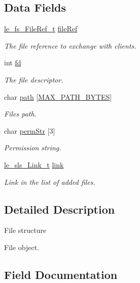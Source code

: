 \subsection*{Data Fields}
\begin{DoxyCompactItemize}
\item 
\hyperlink{le__fs_8h_a5d6a6ea918795062df6645f9ae8ebfe0}{le\+\_\+fs\+\_\+\+File\+Ref\+\_\+t} \hyperlink{struct_file__t_a0cdf3f9e3ed35e42fb588720abaff401}{file\+Ref}
\begin{DoxyCompactList}\small\item\em The file reference to exchange with clients. \end{DoxyCompactList}\item 
int \hyperlink{struct_file__t_aea84e1e696bc72ad69ed5126359807bc}{fd}
\begin{DoxyCompactList}\small\item\em The file descriptor. \end{DoxyCompactList}\item 
char \hyperlink{struct_file__t_a70c735d041b29e756569d3dae1068700}{path} \mbox{[}\hyperlink{sbtrace_8c_a7e9706382472a1711169460723649958}{M\+A\+X\+\_\+\+P\+A\+T\+H\+\_\+\+B\+Y\+T\+ES}\mbox{]}
\begin{DoxyCompactList}\small\item\em File\textquotesingle{}s path. \end{DoxyCompactList}\item 
char \hyperlink{struct_file__t_a78937ec566d59e81fe2f7168a2ca0918}{perm\+Str} \mbox{[}3\mbox{]}
\begin{DoxyCompactList}\small\item\em Permission string. \end{DoxyCompactList}\item 
\hyperlink{structle__sls___link__t}{le\+\_\+sls\+\_\+\+Link\+\_\+t} \hyperlink{struct_file__t_aa485eb530821ae115002a24507750cdd}{link}
\begin{DoxyCompactList}\small\item\em Link in the list of added files. \end{DoxyCompactList}\end{DoxyCompactItemize}


\subsection{Detailed Description}
File structure

File object. 

\subsection{Field Documentation}
